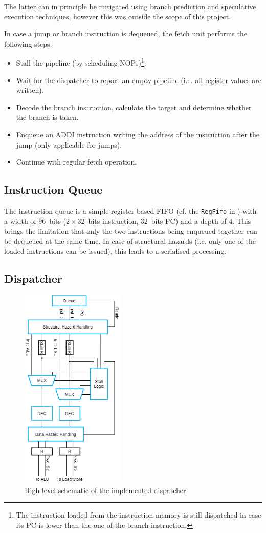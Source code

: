 \documentclass[conference]{IEEEtran}
\begin{document}
The latter can in principle be mitigated using branch prediction and speculative execution techniques, however this was outside the scope of this project.

In case a jump or branch instruction is dequeued, the fetch unit performs the following steps.
\begin{itemize}
	\item Stall the pipeline (by scheduling NOPs)\footnote{The instruction loaded from the instruction memory is still dispatched in case its PC is lower than the one of the branch instruction.}.
	\item Wait for the dispatcher to report an empty pipeline (i.e. all register values are written).
	\item Decode the branch instruction, calculate the target and determine whether the branch is taken.
	\item Enqueue an ADDI instruction writing the address of the instruction after the jump (only applicable for jumps).
	\item Continue with regular fetch operation.
\end{itemize}

\subsection{Instruction Queue}
The instruction queue is a simple register based FIFO (cf. the \verb|RegFifo| in \cite{schoeberl}) with a width of $96$~bits ($2\times32$~bits instruction, $32$~bits PC) and a depth of $4$. This brings the limitation that only the two instructions being enqueued together can be dequeued at the same time. In case of structural hazards (i.e. only one of the loaded instructions can be issued), this leads to a serialised processing.

\subsection{Dispatcher} \label{sec:dispatch}

\begin{figure}
	\centering
	\includegraphics[width=5cm]{dispatcher.png}
	\caption{High-level schematic of the implemented dispatcher}
	\label{fig:dispatcher}
\end{figure}
\end{document}
